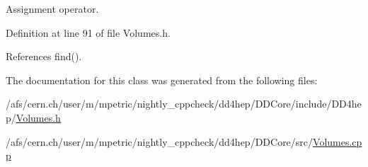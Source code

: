 Assignment operator. 



Definition at line 91 of file Volumes.\+h.



References find().



The documentation for this class was generated from the following files\+:\begin{DoxyCompactItemize}
\item 
/afs/cern.\+ch/user/m/mpetric/nightly\+\_\+cppcheck/dd4hep/\+D\+D\+Core/include/\+D\+D4hep/\hyperlink{_volumes_8h}{Volumes.\+h}\item 
/afs/cern.\+ch/user/m/mpetric/nightly\+\_\+cppcheck/dd4hep/\+D\+D\+Core/src/\hyperlink{_volumes_8cpp}{Volumes.\+cpp}\end{DoxyCompactItemize}

